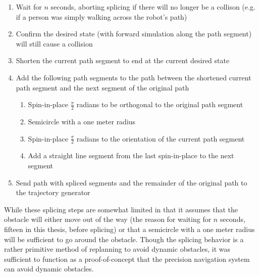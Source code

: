 \begin{enumerate}
\item Wait for $n$ seconds, aborting splicing if there will no longer be a collison (e.g. if a person was simply walking across the robot's path)
\item Confirm the desired state (with forward simulation along the path segment) will still cause a collision
\item Shorten the current path segment to end at the current desired state
\item Add the following path segments to the path between the shortened current path segment and the next segment of the original path
	\begin{enumerate}
	\item Spin-in-place $\frac{\pi}{2}$ radians to be orthogonal to the original path segment
	\item Semicircle with a one meter radius
	\item Spin-in-place $\frac{\pi}{2}$ radians to the orientation of the current path segment
	\item Add a straight line segment from the last spin-in-place to the next segment
	\end{enumerate}
\item Send path with spliced segments and the remainder of the original path to the trajectory generator
\end{enumerate}

While these splicing steps are somewhat limited in that it assumes that the obstacle will either move out of the way (the reason for waiting for $n$ seconds, fifteen in this thesis, before splicing) or that a semicircle with a one meter radius will be sufficient to go around the obstacle. Though the splicing behavior is a rather primitive method of replanning to avoid dynamic obstacles, it was sufficient to function as a proof-of-concept that the precision navigation system can avoid dynamic obstacles.

